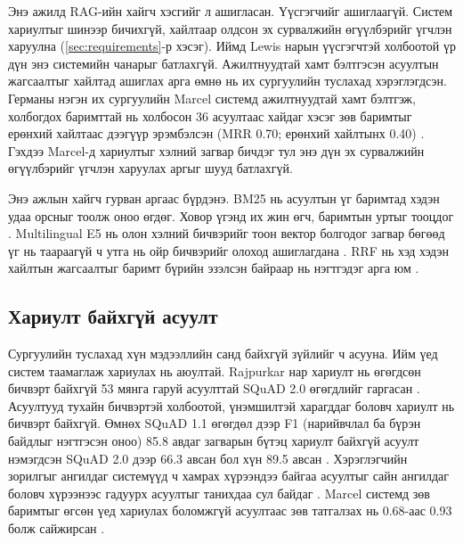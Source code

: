 Энэ ажилд RAG-ийн хайгч хэсгийг л ашигласан. Үүсгэгчийг ашиглаагүй. Систем хариултыг шинээр бичихгүй, хайлтаар олдсон эх сурвалжийн өгүүлбэрийг үгчлэн харуулна (\ref{sec:requirements}-р хэсэг). Иймд Lewis нарын үүсгэгчтэй холбоотой үр дүн энэ системийн чанарыг батлахгүй. Ажилтнуудтай хамт бэлтгэсэн асуултын жагсаалтыг хайлтад ашиглах арга өмнө нь их сургуулийн туслахад хэрэглэгдсэн. Германы нэгэн их сургуулийн Marcel системд ажилтнуудтай хамт бэлтгэж, холбогдох баримттай нь холбосон 36 асуултаас хайдаг хэсэг зөв баримтыг ерөнхий хайлтаас дээгүүр эрэмбэлсэн (MRR 0.70; ерөнхий хайлтынх 0.40) \cite{trienes2025marcel}. Гэхдээ Marcel-д хариултыг хэлний загвар бичдэг тул энэ дүн эх сурвалжийн өгүүлбэрийг үгчлэн харуулах аргыг шууд батлахгүй.

\iffull
Энэ ажлын хайгч гурван аргаас бүрдэнэ. BM25 нь асуултын үг баримтад хэдэн удаа орсныг тоолж оноо өгдөг. Ховор үгэнд их жин өгч, баримтын уртыг тооцдог \cite{robertson2009bm25}. Multilingual E5 нь олон хэлний бичвэрийг тоон вектор болгодог загвар бөгөөд үг нь таараагүй ч утга нь ойр бичвэрийг олоход ашиглагдана \cite{wang2024me5}. \ac{RRF} нь хэд хэдэн хайлтын жагсаалтыг баримт бүрийн эзэлсэн байраар нь нэгтгэдэг арга юм \cite{cormack2009rrf}.

\subsection{Хариулт байхгүй асуулт}
\label{sec:lit-unanswerable}

Сургуулийн туслахад хүн мэдээллийн санд байхгүй зүйлийг ч асууна. Ийм үед систем таамаглаж хариулах нь аюултай. Rajpurkar нар хариулт нь өгөгдсөн бичвэрт байхгүй 53 мянга гаруй асуулттай SQuAD 2.0 өгөгдлийг гаргасан \cite{rajpurkar2018squad2}. Асуултууд тухайн бичвэртэй холбоотой, үнэмшилтэй харагддаг боловч хариулт нь бичвэрт байхгүй. Өмнөх SQuAD 1.1 өгөгдөл дээр F1 (нарийвчлал ба бүрэн байдлыг нэгтгэсэн оноо) 85.8 авдаг загварын бүтэц хариулт байхгүй асуулт нэмэгдсэн SQuAD 2.0 дээр 66.3 авсан бол хүн 89.5 авсан \cite{rajpurkar2018squad2}. Хэрэглэгчийн зорилгыг ангилдаг системүүд ч хамрах хүрээндээ байгаа асуултыг сайн ангилдаг боловч хүрээнээс гадуурх асуултыг танихдаа сул байдаг \cite{larson2019clinc}. Marcel системд зөв баримтыг өгсөн үед хариулах боломжгүй асуултаас зөв татгалзах нь 0.68-аас 0.93 болж сайжирсан \cite{trienes2025marcel}.


